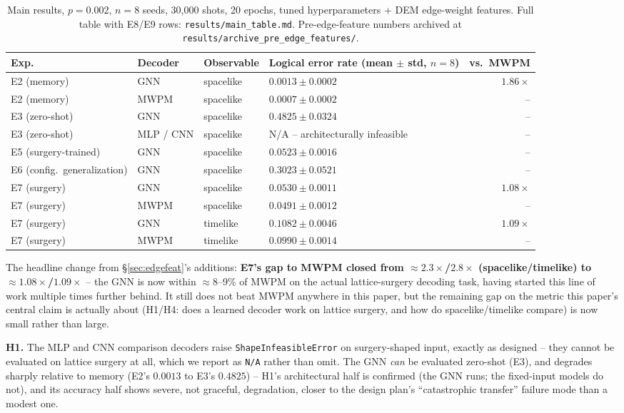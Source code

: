\documentclass[11pt]{article}
\begin{document}
\begin{table}[h]
\centering
\small
\begin{tabular}{llllr}
\toprule
Exp. & Decoder & Observable & Logical error rate (mean $\pm$ std, $n=8$) & vs.\ MWPM \\
\midrule
E2 (memory) & GNN & spacelike & $0.0013 \pm 0.0002$ & $1.86\times$ \\
E2 (memory) & MWPM & spacelike & $0.0007 \pm 0.0002$ & -- \\
E3 (zero-shot) & GNN & spacelike & $0.4825 \pm 0.0324$ & -- \\
E3 (zero-shot) & MLP / CNN & spacelike & N/A -- architecturally infeasible & -- \\
E5 (surgery-trained) & GNN & spacelike & $0.0523 \pm 0.0016$ & -- \\
E6 (config.\ generalization) & GNN & spacelike & $0.3023 \pm 0.0521$ & -- \\
E7 (surgery) & GNN & spacelike & $\mathbf{0.0530 \pm 0.0011}$ & $\mathbf{1.08\times}$ \\
E7 (surgery) & MWPM & spacelike & $0.0491 \pm 0.0012$ & -- \\
E7 (surgery) & GNN & timelike & $\mathbf{0.1082 \pm 0.0046}$ & $\mathbf{1.09\times}$ \\
E7 (surgery) & MWPM & timelike & $0.0990 \pm 0.0014$ & -- \\
\bottomrule
\end{tabular}
\caption{Main results, $p=0.002$, $n=8$ seeds, 30{,}000 shots, 20 epochs,
tuned hyperparameters + DEM edge-weight features. Full table with E8/E9
rows: \texttt{results/main\_table.md}. Pre-edge-feature numbers archived at
\texttt{results/archive\_pre\_edge\_features/}.}
\label{tab:main}
\end{table}

The headline change from \S\ref{sec:edgefeat}'s additions: \textbf{E7's gap
to MWPM closed from $\approx 2.3\times$/$2.8\times$ (spacelike/timelike) to
$\approx 1.08\times$/$1.09\times$} -- the GNN is now within
$\approx$8--9\% of MWPM on the actual lattice-surgery decoding task, having
started this line of work multiple times further behind. It still does not
beat MWPM anywhere in this paper, but the remaining gap on the metric this
paper's central claim is actually about (H1/H4: does a learned decoder work
on lattice surgery, and how do spacelike/timelike compare) is now small
rather than large.

\textbf{H1.} The MLP and CNN comparison decoders raise
\texttt{ShapeInfeasibleError} on surgery-shaped input, exactly as designed
-- they cannot be evaluated on lattice surgery at all, which we report as
\texttt{N/A} rather than omit. The GNN \emph{can} be evaluated zero-shot
(E3), and degrades sharply relative to memory (E2's $0.0013$ to E3's
$0.4825$) -- H1's architectural half is confirmed (the GNN runs; the
fixed-input models do not), and its accuracy half shows severe, not
graceful, degradation, closer to the design plan's ``catastrophic transfer''
failure mode than a modest one.
\end{document}
